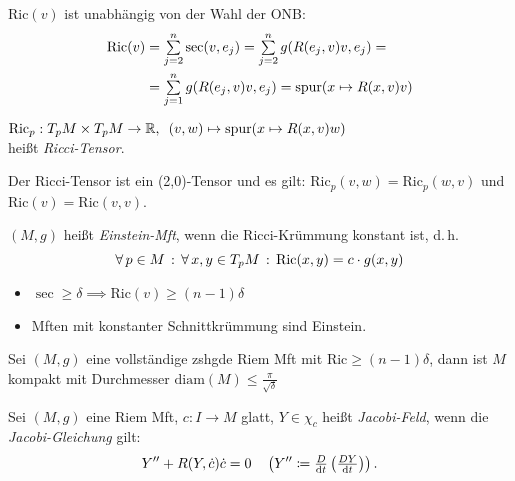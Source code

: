 \documentclass{cheat-sheet}
\newcommand{\diam}{\mathrm{diam}} %
\newcommand{\Ric}{\mathrm{Ric}} %
\begin{document}
\begin{bem}
  $\Ric(v)$ ist unabhängig von der Wahl der ONB:
  \begin{align*}
    \Ric(v) & = \sum_{j=2}^n \sec(v,e_j) = \sum_{j=2}^n g(R(e_j,v)v, e_j) =\\
    & = \sum_{j=1}^n g(R(e_j,v)v, e_j) = \spur(x \mapsto R(x,v)v)
  \end{align*}
\end{bem}

\begin{defn}
  $\Ric_p : T_p M \times T_p M \to \R, \enspace (v,w) \mapsto \spur(x \mapsto R(x,v)w)$\\
  heißt \emph{Ricci-Tensor}.
\end{defn}

\begin{bem}
  Der Ricci-Tensor ist ein (2,0)-Tensor und es gilt: $\Ric_p(v,w) = \Ric_p(w,v)$ und $\Ric(v) = \Ric(v,v)$.
\end{bem}

\begin{defn}
  $(M, g)$ heißt \emph{Einstein-Mft}, wenn die Ricci-Krümmung konstant ist, d.\,h.
  \[ \fa{p \in M} \fa{x,y \in T_p M} \Ric(x,y) = c \cdot g(x,y) \]
\end{defn}

\begin{beob}
  \begin{itemize}
    \item $\sec \geq \delta \implies \Ric(v) \geq (n{-}1) \delta$
    \item Mften mit konstanter Schnittkrümmung sind Einstein.
  \end{itemize}
\end{beob}

\begin{satz}
  Sei $(M, g)$ eine vollständige zshgde Riem Mft mit $\Ric \geq (n{-}1)\delta$, dann ist $M$ kompakt mit Durchmesser $\diam(M) \leq \tfrac{\pi}{\sqrt{\delta}}$
\end{satz}


\begin{defn}
  Sei $(M, g)$ eine Riem Mft, $c : I \to M$ glatt, $Y \in \chi_c$ heißt \emph{Jacobi-Feld}, wenn die \emph{Jacobi-Gleichung} gilt:
  \[
    Y'' + R(Y, \dot{c}) \dot{c} = 0 \quad
    \left( Y'' \coloneqq \tfrac{D}{\mathrm{d} t} \left( \tfrac{D Y}{\mathrm{d} t} \right) \right).
  \]
\end{defn}
\end{document}
